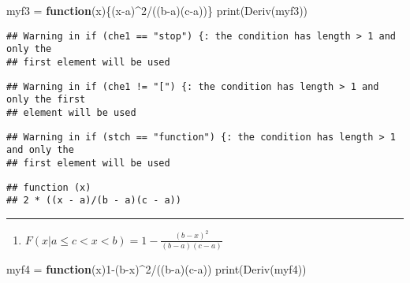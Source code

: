 \documentclass[
]{article}
\newenvironment{Shaded}{\begin{snugshade}}{\end{snugshade}}
\newcommand{\ControlFlowTok}[1]{\textcolor[rgb]{0.13,0.29,0.53}{\textbf{#1}}}
\newcommand{\DecValTok}[1]{\textcolor[rgb]{0.00,0.00,0.81}{#1}}
\newcommand{\FunctionTok}[1]{\textcolor[rgb]{0.00,0.00,0.00}{#1}}
\newcommand{\NormalTok}[1]{#1}
\newcommand{\OtherTok}[1]{\textcolor[rgb]{0.56,0.35,0.01}{#1}}
\newcommand{\SpecialCharTok}[1]{\textcolor[rgb]{0.00,0.00,0.00}{#1}}
\providecommand{\tightlist}{%
  \setlength{\itemsep}{0pt}\setlength{\parskip}{0pt}}
\begin{document}
\begin{Shaded}
\begin{Highlighting}[]
\NormalTok{myf3 }\OtherTok{=} \ControlFlowTok{function}\NormalTok{(x)\{(x}\SpecialCharTok{{-}}\NormalTok{a)}\SpecialCharTok{\^{}}\DecValTok{2}\SpecialCharTok{/}\NormalTok{((b}\SpecialCharTok{{-}}\NormalTok{a)(c}\SpecialCharTok{{-}}\NormalTok{a))\}}
\FunctionTok{print}\NormalTok{(}\FunctionTok{Deriv}\NormalTok{(myf3))}
\end{Highlighting}
\end{Shaded}

\begin{verbatim}
## Warning in if (che1 == "stop") {: the condition has length > 1 and only the
## first element will be used
\end{verbatim}

\begin{verbatim}
## Warning in if (che1 != "[") {: the condition has length > 1 and only the first
## element will be used
\end{verbatim}

\begin{verbatim}
## Warning in if (stch == "function") {: the condition has length > 1 and only the
## first element will be used
\end{verbatim}

\begin{verbatim}
## function (x) 
## 2 * ((x - a)/(b - a)(c - a))
\end{verbatim}

\begin{center}\rule{0.5\linewidth}{0.5pt}\end{center}

\begin{enumerate}
\def\labelenumi{\arabic{enumi}.}
\setcounter{enumi}{3}
\tightlist
\item
  \(F(x|a≤c<x<b)=1−\frac{(b−x)^2}{(b−a)(c−a)}\)
\end{enumerate}

\begin{Shaded}
\begin{Highlighting}[]
\NormalTok{myf4 }\OtherTok{=} \ControlFlowTok{function}\NormalTok{(x)}\DecValTok{1}\SpecialCharTok{{-}}\NormalTok{(b}\SpecialCharTok{{-}}\NormalTok{x)}\SpecialCharTok{\^{}}\DecValTok{2}\SpecialCharTok{/}\NormalTok{((b}\SpecialCharTok{{-}}\NormalTok{a)(c}\SpecialCharTok{{-}}\NormalTok{a))}
\FunctionTok{print}\NormalTok{(}\FunctionTok{Deriv}\NormalTok{(myf4))}
\end{Highlighting}
\end{Shaded}
\end{document}
